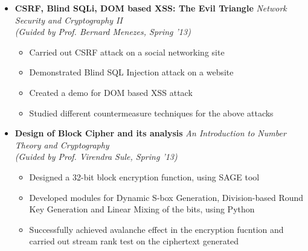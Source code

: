 \begin{itemize}
	\item \textbf{CSRF, Blind SQLi, DOM based XSS: The Evil Triangle} \hfill \emph{Network Security and Cryptography II} \\
	\emph{(Guided by Prof. Bernard Menezes, Spring '13)} \hfill \\[-0.6cm]
	\begin{itemize}
	      \item Carried out CSRF attack on a social networking site \\[-0.5cm]
	      \item Demonstrated Blind SQL Injection attack on a website \\[-0.5cm]
	      \item Created a demo for DOM based XSS attack \\[-0.5cm]
	      \item Studied different countermeasure techniques for the above attacks \\[-0.6cm]
	\end{itemize}
	
	\item \textbf{Design of Block Cipher and its analysis} \hfill \emph{An Introduction to Number Theory and Cryptography} \\
	\emph{(Guided by Prof. Virendra Sule, Spring '13)} \hfill \\[-0.6cm]
	\begin{itemize}
	      \item Designed a 32-bit block encryption function, using SAGE tool \\[-0.5cm]
	      \item Developed modules for Dynamic S-box Generation, Division-based Round Key Generation and Linear Mixing of the bits, using Python \\[-0.5cm]
	      \item Successfully achieved avalanche effect in the encryption fucntion and carried out stream rank test on the ciphertext generated \\[-0.6cm]
	\end{itemize}


\end{itemize}
